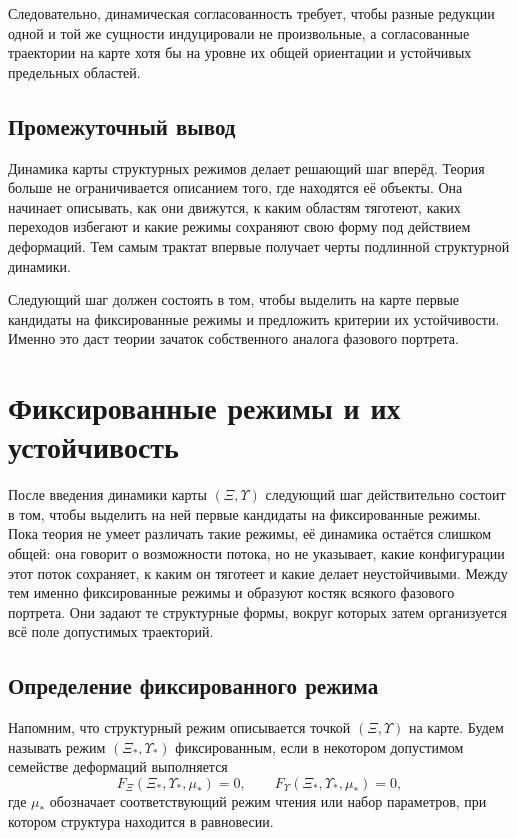 \documentclass[12pt,a4paper]{article}
\begin{document}
Следовательно, динамическая согласованность требует, чтобы разные редукции одной и той же сущности индуцировали не произвольные, а согласованные траектории на карте хотя бы на уровне их общей ориентации и устойчивых предельных областей.

\subsection{Промежуточный вывод}

Динамика карты структурных режимов делает решающий шаг вперёд. Теория больше не ограничивается описанием того, где находятся её объекты. Она начинает описывать, как они движутся, к каким областям тяготеют, каких переходов избегают и какие режимы сохраняют свою форму под действием деформаций. Тем самым трактат впервые получает черты подлинной структурной динамики.

Следующий шаг должен состоять в том, чтобы выделить на карте первые кандидаты на фиксированные режимы и предложить критерии их устойчивости. Именно это даст теории зачаток собственного аналога фазового портрета.


\section{Фиксированные режимы и их устойчивость}

После введения динамики карты \((\Xi,\Upsilon)\) следующий шаг действительно состоит в том, чтобы выделить на ней первые кандидаты на фиксированные режимы. Пока теория не умеет различать такие режимы, её динамика остаётся слишком общей: она говорит о возможности потока, но не указывает, какие конфигурации этот поток сохраняет, к каким он тяготеет и какие делает неустойчивыми. Между тем именно фиксированные режимы и образуют костяк всякого фазового портрета. Они задают те структурные формы, вокруг которых затем организуется всё поле допустимых траекторий.

\subsection{Определение фиксированного режима}

Напомним, что структурный режим описывается точкой \((\Xi,\Upsilon)\) на карте. Будем называть режим \((\Xi_*,\Upsilon_*)\) фиксированным, если в некотором допустимом семействе деформаций выполняется
\begin{equation}
F_{\Xi}(\Xi_*,\Upsilon_*,\mu_*) = 0,
\qquad
F_{\Upsilon}(\Xi_*,\Upsilon_*,\mu_*) = 0,
\end{equation}
где \(\mu_*\) обозначает соответствующий режим чтения или набор параметров, при котором структура находится в равновесии.
\end{document}
